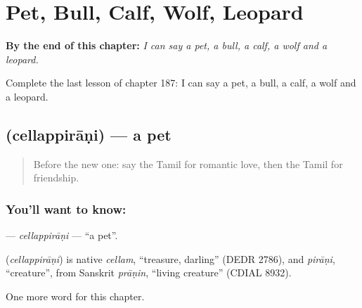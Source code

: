 
\chapter{Pet, Bull, Calf, Wolf, Leopard}
\label{ch:ta-pet-bull-calf-wolf-leopard}

\begin{chapteropening}
\textbf{By the end of this chapter:} \emph{I can say a pet, a bull, a calf, a wolf and a leopard.}

Complete the last lesson of chapter 187: I can say a pet, a bull, a calf, a wolf and a leopard.
\end{chapteropening}

\section[\texorpdfstring{\ta{செல்லப்பிராணி} (cellappirāṇi)}{செல்லப்பிராணி (cellappirāṇi)}]{ (cellappirāṇi) — a pet}

\label{lesson:TA-C187-cellappirani}



\begin{quote}
Before the new one: say the Tamil for romantic love, then the Tamil for friendship.
\end{quote}

\subsection*{You'll want to know: }
\textbf{} — \emph{cellappirāṇi} — \textquotedblleft{}a pet\textquotedblright{}.

\begin{cousinweb}
\textbf{} (\emph{cellappirāṇi}) is native \emph{cellam}, \textquotedblleft{}treasure, darling\textquotedblright{} (DEDR 2786), and \emph{pirāṇi}, \textquotedblleft{}creature\textquotedblright{}, from Sanskrit \emph{prāṇin}, \textquotedblleft{}living creature\textquotedblright{} (CDIAL 8932).
\end{cousinweb}

\begin{grammarlens}[title={What you've built}]
One more word for this chapter.
\end{grammarlens}

